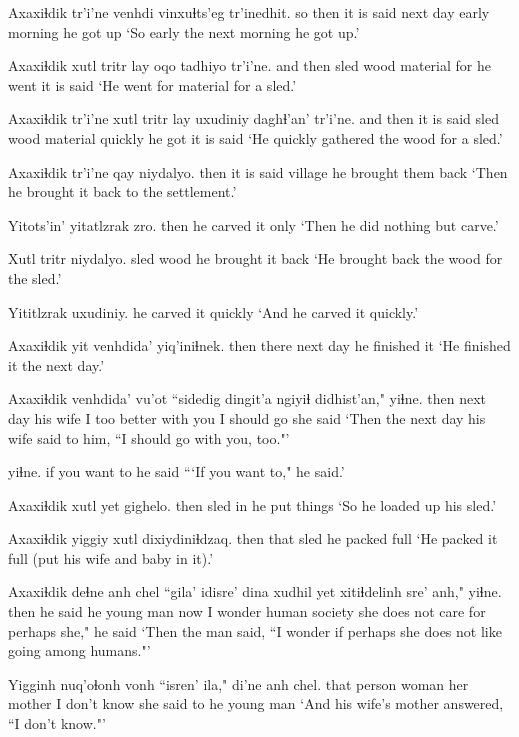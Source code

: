 \documentclass[12pt]{article}
\begin{document}
\gll Axaxiɬdik tr'i'ne venhdi vinxuɬts'eg   tr'inedhit.
{so then} {it is said} {next day} {early morning} {he got up} 
\glt `So early the next morning he got up.'
\glend

\gll Axaxiɬdik xutl tritr lay  oqo tadhiyo tr'i'ne.
{and then} sled wood material for {he went} {it is said}
\glt `He went for material for a sled.'
\glend

\gll Axaxiɬdik tr'i'ne xutl tritr lay  uxudiniy daghɬ'an' tr'i'ne.
{and then} {it is said} sled wood material quickly  {he got} {it is said}
\glt `He quickly gathered the wood for a sled.'
\glend

\gll Axaxiɬdik tr'i'ne qay  niydalyo.
then  {it is said} village {he brought them back}
\glt `Then he brought it back to the settlement.'
\glend

\gll Yitots'in' yitatlzrak zro.
then  {he carved it} only
\glt `Then he did nothing but carve.'
\glend

\gll Xutl tritr niydalyo.
sled wood {he brought it back}
\glt `He brought back the wood for the sled.'
\glend

\gll Yititlzrak uxudiniy.
{he carved it} quickly
\glt `And he carved it quickly.'
\glend

\gll Axaxiɬdik yit venhdida' yiq'iniɬnek.
then  there {next day} {he finished it}
\glt `He finished it the next day.'
\glend

\gll Axaxiɬdik venhdida' vu'ot   ``sidedig dingit'a ngiyiɬ  didhist'an," yiɬne.
then  {next day} {his wife} {I too}  better {with you} {I should go} {she said}
\glt `Then the next day his wife said to him, ``I should go with you, too."'
\glend

 yiɬne.
{if you want to} {he said}
\glt ```If you want to," he said.'
\glend

\gll Axaxiɬdik xutl yet gighelo.
then  sled in {he put things}
\glt `So he loaded up his sled.'
\glend

\gll Axaxiɬdik yiggiy xutl dixiydiniɬdzaq.
then  that sled {he packed full}
\glt `He packed it full (put his wife and baby in it).'
\glend

\gll Axaxiɬdik deɬne anh  chel ``gila' idisre' dina {xudhil yet} xitiɬdelinh  sre'  anh," yiɬne.
then  {he said} he {young man} now {I wonder} human society {she does not care for} perhaps she," {he said}
\glt `Then the man said, ``I wonder if perhaps she does not like going among humans."'
\glend

\gll Yigginh nuq'oɬonh vonh  {``isren' ila,"} di'ne anh chel.
{that person} woman {her mother} {I don't know} {she said to} he {young man}
\glt `And his wife's mother answered, ``I don't know."'
\glend
\end{document}
